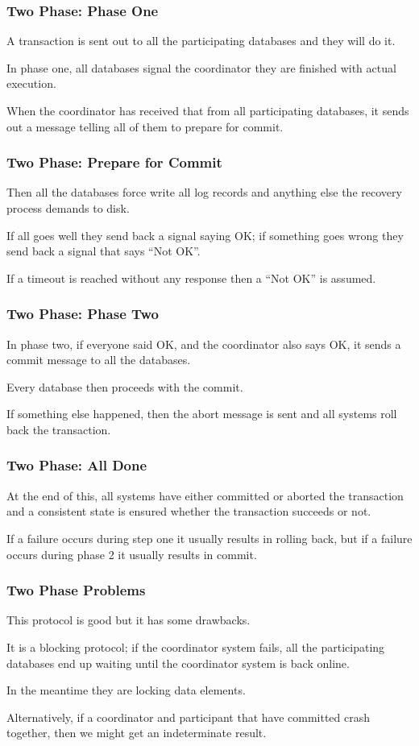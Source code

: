 \begin{frame}
\frametitle{Two Phase: Phase One}

A transaction is sent out to all the participating databases and they will do it.

In phase one, all databases signal the coordinator they are finished with actual execution.

When the coordinator has received that from all participating databases, it sends out a message telling all of them to prepare for commit.


\end{frame}

\begin{frame}
\frametitle{Two Phase: Prepare for Commit}

Then all the databases force write all log records and anything else the recovery process demands to disk. 

If all goes well they send back a signal saying OK; if something goes wrong they send back a signal that says ``Not OK''. 

If a timeout is reached without any response then a ``Not OK'' is assumed.

\end{frame}

\begin{frame}
\frametitle{Two Phase: Phase Two}

In phase two, if everyone said OK, and the coordinator also says OK, it sends a commit message to all the databases. 

Every database then proceeds with the commit. 

If something else happened, then the abort message is sent and all systems roll back the transaction. 

\end{frame}


\begin{frame}
\frametitle{Two Phase: All Done}

At the end of this, all systems have either committed or aborted the transaction and a consistent state is ensured whether the transaction succeeds or not. 

If a failure occurs during step one it usually results in rolling back, but if a failure occurs during phase 2 it usually results in commit.

\end{frame}

\begin{frame}
\frametitle{Two Phase Problems}

This protocol is good but it has some drawbacks. 

It is a blocking protocol; if the coordinator system fails, all the participating databases end up waiting until the coordinator system is back online. 

In the meantime they are locking data elements.

Alternatively, if a coordinator and participant that have committed crash together, then we might get an indeterminate result.

\end{frame}


